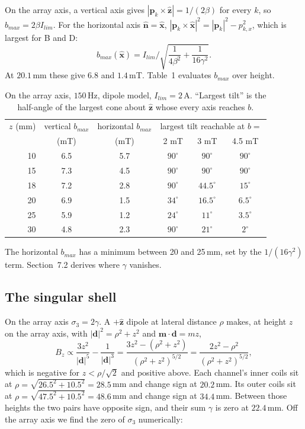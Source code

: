 \documentclass[11pt]{article}
\newcommand{\vb}[1]{\mathbf{#1}}
\newcommand{\uv}[1]{\hat{\mathbf{#1}}}
\begin{document}
On the array axis, a vertical axis gives $|\vb p_k\times\uv z| = 1/(2\beta)$ for every $k$, so
$b_{max} = 2\beta I_{lim}$. For the horizontal axis $\uv n=\uv x$,
$|\vb p_k\times\uv x|^2 = |\vb p_k|^2 - p_{k,x}^2$, which is largest for B and D:
\begin{equation}
  b_{max}(\uv x) = I_{lim}\Big/\sqrt{\frac{1}{4\beta^2} + \frac{1}{16\gamma^2}} .
\end{equation}
At $20.1$\,mm these give $6.8$ and $1.4$\,mT. Table~1 evaluates $b_{max}$ over height.

\begin{table}[h]\centering
\begin{tabular}{rccccc}\toprule
$z$ (mm) & vertical $b_{max}$ & horizontal $b_{max}$ & \multicolumn{3}{c}{largest tilt reachable at $b=$}\\
 & (mT) & (mT) & 2 mT & 3 mT & 4.5 mT\\\midrule
10 & 6.5 & 5.7 & $90^\circ$ & $90^\circ$ & $90^\circ$\\
15 & 7.3 & 4.5 & $90^\circ$ & $90^\circ$ & $90^\circ$\\
18 & 7.2 & 2.8 & $90^\circ$ & $44.5^\circ$ & $15^\circ$\\
20 & 6.9 & 1.5 & $34^\circ$ & $16.5^\circ$ & $6.5^\circ$\\
25 & 5.9 & 1.2 & $24^\circ$ & $11^\circ$ & $3.5^\circ$\\
30 & 4.8 & 2.3 & $90^\circ$ & $21^\circ$ & $2^\circ$\\\bottomrule
\end{tabular}
\caption{On the array axis, $150$\,Hz, dipole model, $I_{lim}=2$\,A. ``Largest tilt'' is the
half-angle of the largest cone about $\uv z$ whose every axis reaches $b$.}
\end{table}

The horizontal $b_{max}$ has a minimum between 20 and 25\,mm, set by the $1/(16\gamma^2)$ term.
Section~7.2 derives where $\gamma$ vanishes.

\subsection{The singular shell}
On the array axis $\sigma_3 = 2\gamma$. A $+\uv z$ dipole at lateral distance $\rho$ makes, at
height $z$ on the array axis, with $|\vb d|^2 = \rho^2 + z^2$ and $\vb m\cdot\vb d = mz$,
\begin{equation}
  B_z \propto \frac{3z^2}{|\vb d|^5} - \frac{1}{|\vb d|^3}
  = \frac{3z^2 - (\rho^2+z^2)}{(\rho^2+z^2)^{5/2}} = \frac{2z^2-\rho^2}{(\rho^2+z^2)^{5/2}},
\end{equation}
which is negative for $z<\rho/\sqrt2$ and positive above. Each channel's inner coils sit at
$\rho = \sqrt{26.5^2+10.5^2} = 28.5$\,mm and change sign at $20.2$\,mm. Its outer coils sit at
$\rho = \sqrt{47.5^2+10.5^2} = 48.6$\,mm and change sign at $34.4$\,mm. Between those heights the
two pairs have opposite sign, and their sum $\gamma$ is zero at $22.4$\,mm. Off the array axis we
find the zero of $\sigma_3$ numerically:
\end{document}
